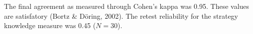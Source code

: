 \documentclass[C:/Users/sunpn505/Documents/studies/WinnerS/Erhebungen/IPhO1718/paper/problem_solving/main/TaylorFrancis/interactapasample]{subfiles}
\begin{document}
The final agreement as measured through Cohen's kappa was 0.95. These values are satisfatory (Bortz \& Döring, 2002). The retest reliability for the strategy knowledge measure was 0.45 ($N=30$).


\end{document}
